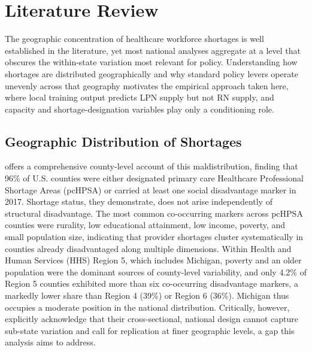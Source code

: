 \documentclass[12pt]{article}
\begin{document}
\section{Literature Review}\label{sec:litreview}

The geographic concentration of healthcare workforce shortages is well established in the literature, yet most national analyses aggregate at a level that obscures the within-state variation most relevant for policy. Understanding how shortages are distributed geographically and why standard policy levers operate unevenly across that geography motivates the empirical approach taken here, where local training output predicts LPN supply but not RN supply, and capacity and shortage-designation variables play only a conditioning role.

\subsection{Geographic Distribution of Shortages}

\citet{streeter2020} offers a comprehensive county-level account of this maldistribution, finding that 96\% of U.S. counties were either designated primary care Healthcare Professional Shortage Areas (pcHPSA) or carried at least one social disadvantage marker in 2017. Shortage status, they demonstrate, does not arise independently of structural disadvantage. The most common co-occurring markers across pcHPSA counties were rurality, low educational attainment, low income, poverty, and small population size, indicating that provider shortages cluster systematically in counties already disadvantaged along multiple dimensions. Within Health and Human Services (HHS) Region 5, which includes Michigan, poverty and an older population were the dominant sources of county-level variability, and only 4.2\% of Region 5 counties exhibited more than six co-occurring disadvantage markers, a markedly lower share than Region 4 (39\%) or Region 6 (36\%). Michigan thus occupies a moderate position in the national distribution. Critically, however, \citet{streeter2020} explicitly acknowledge that their cross-sectional, national design cannot capture sub-state variation and call for replication at finer geographic levels, a gap this analysis aims to address.
\end{document}

